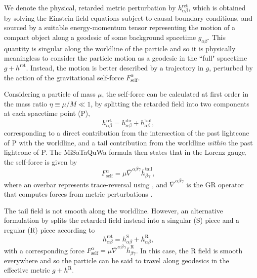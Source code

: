 We denote the physical, retarded metric perturbation by $h_{\alpha\beta}^{\mathrm{ret}}$, which is obtained by solving the Einstein field equations subject to causal boundary conditions, and sourced by a suitable energy-momentum tensor representing the motion of a compact object along a geodesic of some background spacetime $g_{\alpha\beta}$. This quantity is singular along the worldline of the particle and so it is physically meaningless to consider the particle motion as a geodesic in the ``full" spacetime $g + h^\mathrm{ret}$. Instead, the motion is better described by a trajectory in $g$, perturbed by the action of the gravitational self-force $F^\alpha_\mathrm{self}$.

Considering a particle of mass $\mu$, the self-force can be calculated at first order in the mass ratio $\eta\equiv\mu/M\ll 1$, by splitting the retarded field into two components at each spacetime point (P),
\begin{equation}
h_{\alpha\beta}^{\mathrm{ret}} = h_{\alpha\beta}^{\mathrm{dir}} + h_{\alpha\beta}^{\mathrm{tail}},
\end{equation}
corresponding to a direct contribution from the intersection of the past lightcone of P with the worldline, and a tail contribution from the worldline \textit{within} the past lightcone of P. The MiSaTaQuWa formula \citep{mino_gravitational_1997, quinn_axiomatic_1997} then states that in the Lorenz gauge, the self-force is given by
\begin{equation}
F^\alpha_\mathrm{self} = \mu \bar{\nabla}^{\alpha\beta\gamma} \bar{h}_{\beta\gamma}^{\mathrm{tail}},
\end{equation}
where an overbar represents trace-reversal using , and $\bar{\nabla}^{\alpha\beta\gamma}$ is the GR operator that computes forces from metric perturbations \citep{barack_gravitational_2009}.

The tail field is not smooth along the worldline. However, an alternative formulation by \citet{detweiler_self-force_2003} splits the retarded field instead into a singular (S) piece and a regular (R) piece according to
\begin{equation}
h_{\alpha\beta}^{\mathrm{ret}} = h_{\alpha\beta}^{\mathrm{S}} + h_{\alpha\beta}^{\mathrm{R}},
\end{equation}
with a corresponding force $F^\alpha_\mathrm{self} = \mu \bar{\nabla}^{\alpha\beta\gamma} \bar{h}_{\beta\gamma}^{\mathrm{R}}$. In this case, the R field is smooth everywhere and so the particle can be said to travel along geodesics in the effective metric $g+h^\mathrm{R}$.

